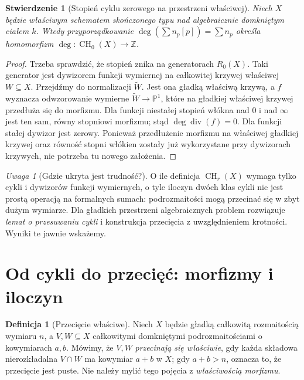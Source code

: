 \documentclass[11pt,a4paper,openany]{report}
\numberwithin{equation}{section}
\theoremstyle{plain}
\newtheorem{stwierdzenie}[twierdzenie]{Stwierdzenie}
\theoremstyle{definition}
\newtheorem{definicja}[twierdzenie]{Definicja}
\theoremstyle{remark}
\newtheorem{uwaga}[twierdzenie]{Uwaga}
\newcommand{\Z}{\mathbb Z}
\newcommand{\PP}{\mathbb P}
\begin{document}
\begin{stwierdzenie}[Stopień cyklu zerowego na przestrzeni właściwej]
\label{st:ga7-degree}
Niech $X$ będzie właściwym schematem skończonego typu nad
algebraicznie domkniętym ciałem $k$. Wtedy przyporządkowanie
$\deg(\sum n_p[p])=\sum n_p$ określa homomorfizm
$\deg:\operatorname{CH}_0(X)\to\Z$.
\end{stwierdzenie}
\begin{proof}
Trzeba sprawdzić, że stopień znika na generatorach
$R_0(X)$. Taki generator jest dywizorem funkcji
wymiernej na całkowitej krzywej właściwej $W\subseteq X$.
Przejdźmy do normalizacji $\widetilde W$.
Jest ona gładką właściwą krzywą, a $f$ wyznacza
odwzorowanie wymierne $\widetilde W\to\PP^1$, które
na gładkiej właściwej krzywej przedłuża się do morfizmu.
Dla funkcji niestałej stopień włókna nad $0$
i nad $\infty$ jest ten sam, równy stopniowi morfizmu;
stąd $\deg\operatorname{div}(f)=0$. Dla funkcji stałej
dywizor jest zerowy. Ponieważ przedłużenie morfizmu
na właściwej gładkiej krzywej oraz równość stopni włókien
zostały już wykorzystane przy dywizorach krzywych,
nie potrzeba tu nowego założenia.
\end{proof}

\begin{uwaga}[Gdzie ukryta jest trudność?]
O ile definicja $\operatorname{CH}_r(X)$ wymaga tylko
cykli i dywizorów funkcji wymiernych, o tyle iloczyn dwóch
klas cykli nie jest prostą operacją na formalnych sumach:
podrozmaitości mogą przecinać się w zbyt dużym wymiarze.
Dla gładkich przestrzeni algebraicznych problem rozwiązuje
\emph{lemat o przesuwaniu cykli} i konstrukcja przecięcia
z uwzględnieniem krotności. Wyniki te jawnie wskażemy.
\end{uwaga}

\section{Od cykli do przecięć: morfizmy i iloczyn}
\label{sec:ga7-intersection}

\begin{definicja}[Przecięcie właściwe]
\label{def:ga7-proper-intersection}
Niech $X$ będzie gładką całkowitą rozmaitością wymiaru $n$,
a $V,W\subseteq X$ całkowitymi domkniętymi podrozmaitościami
o kowymiarach $a,b$. Mówimy, że $V,W$ \emph{przecinają się
właściwie}, gdy każda składowa nierozkładalna $V\cap W$
ma kowymiar $a+b$ w $X$; gdy $a+b>n$, oznacza to, że
przecięcie jest puste.
Nie należy mylić tego pojęcia z \emph{właściwością morfizmu}.
\end{definicja}
\end{document}
